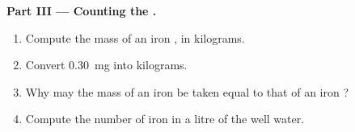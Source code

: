\begin{problem}
\medskip
\noindent\textbf{Part III --- Counting the .}
\begin{enumerate}[resume]
  \item Compute the mass of an iron , in kilograms.
  \item Convert \qty{0.30}{mg} into kilograms.
  \item Why may the mass of an iron  be taken equal to that of an iron
        ?
  \item Compute the number of iron  in a litre of the well water.
\end{enumerate}
\end{problem}

